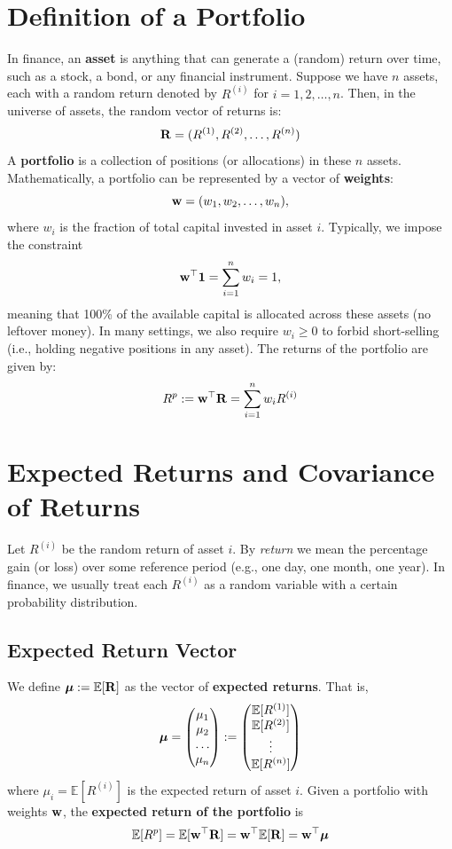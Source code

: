 \section{Definition of a Portfolio}
In finance, an \textbf{asset} is anything that can generate a (random) return over time, such as a stock, a bond, or any financial instrument. Suppose we have $n$ assets, each with a random return denoted by $R^{(i)}$ for $i = 1, 2, \ldots, n$. Then, in the universe of assets, the random vector of returns is:
$$
\mathbf R = (R^{(1)}, R^{(2)}, \ldots, R^{(n)})
$$
A \textbf{portfolio} is a collection of positions (or allocations) in these $n$ assets. Mathematically, a portfolio can be represented by a vector of \textbf{weights}:
$$
\mathbf w = (w_1, w_2, \ldots, w_n),
$$
where $w_i$ is the fraction of total capital invested in asset $i$. Typically, we impose the constraint
$$
\mathbf w^\top\mathbf 1=\sum_{i=1}^n w_i = 1,
$$
meaning that 100\% of the available capital is allocated across these assets (no leftover money). In many settings, we also require $w_i \ge 0$ to forbid short-selling (i.e., holding negative positions in any asset).
The returns of the portfolio are given by: 
$$
R^p := \mathbf w^\top \mathbf R = \sum_{i=1}^n w_i R^{(i)}
$$

\section{Expected Returns and Covariance of Returns}
Let $R^{(i)}$ be the random return of asset $i$. By \emph{return} we mean the percentage gain (or loss) over some reference period (e.g., one day, one month, one year). In finance, we usually treat each $R^{(i)}$ as a random variable with a certain probability distribution. 

\subsection{Expected Return Vector}
We define $\boldsymbol \mu := \mathbb{E}[\mathbf R] $ as the vector of \textbf{expected returns}. That is, 
$$\begin{array}{cc}
\boldsymbol \mu 
=
\left(\begin{matrix} \mu_1 \\ \mu_2 \\ \ldots \\  \mu_n \end{matrix}\right)
:=
\left(
\begin{matrix} 
\mathbb{E}[R^{(1)}] \\ \mathbb{E}[R^{(2)}] \\ \vdots \\ \mathbb{E}[R^{(n)}]
 \end{matrix}
\right)
\end{array}$$
where
$
\mu_i = \mathbb{E}[R^{(i)}]
$ is the expected return of asset $i$. 
Given a portfolio with weights $\mathbf w$, the \textbf{expected return of the portfolio} is
$$
\mathbb{E}[R^p] =
\mathbb{E}[\mathbf w^\top\mathbf R] 
=
\mathbf w^\top \mathbb{E}[\mathbf R] = \mathbf w^\top \boldsymbol \mu 
$$

